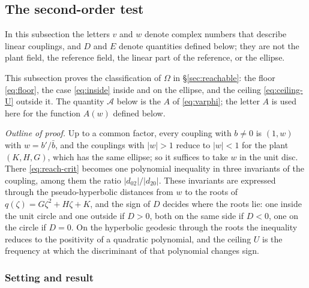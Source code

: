 \documentclass[11pt,reqno]{amsart}
\theoremstyle{plain}
\theoremstyle{definition}
\theoremstyle{remark}
\begin{document}
\subsection{The second-order test}\label{app:reach}
In this subsection the letters $v$ and $w$ denote complex numbers that describe linear couplings, and $D$
and $E$ denote quantities defined below; they are not the plant field, the reference field, the linear part
of the reference, or the ellipse.

This subsection proves the classification of $\Omega$ in \S\ref{sec:reachable}: the
floor \eqref{eq:floor}, the case \eqref{eq:inside} inside and on the ellipse, and the ceiling \eqref{eq:ceiling-U}
outside it. The quantity $\mathcal A$ below is the $A$ of \eqref{eq:varphi}; the letter $A$ is used here for the
function $A(w)$ defined below.

\emph{Outline of proof.} Up to a common factor, every coupling with $b\neq0$ is $(1,w)$ with $w=b'/\bar b$, and the couplings
with $|w|>1$ reduce to $|w|<1$ for the plant $(K,H,G)$, which has the same ellipse; so it suffices to take $w$ in
the unit disc. There \eqref{eq:reach-crit} becomes one polynomial inequality in three invariants of the
coupling, among them the ratio $|d_{02}|/|d_{20}|$. These invariants are expressed through the pseudo-hyperbolic
distances from $w$ to the roots of $q(\zeta)=G\zeta^{2}+H\zeta+K$, and the sign of $D$ decides where the roots lie:
one inside the unit circle and one outside if $D>0$, both on the same side if $D<0$, one on the circle if $D=0$.
On the hyperbolic geodesic through the roots the inequality reduces to the positivity of a quadratic
polynomial, and the ceiling $U$ is the frequency at which the discriminant of that polynomial changes sign.

\subsubsection{Setting and result}
\end{document}
